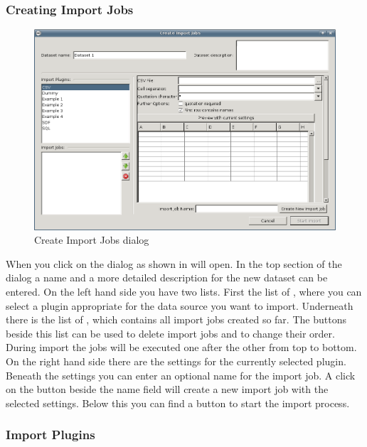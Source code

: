 \subsubsection{Creating Import Jobs}
\begin{figure}[ht]
   \centering
   \includegraphics[width=\textwidth]{images/import/import_dialog_empty.png}
   \caption{Create Import Jobs dialog}
   \label{fig:import_dialog_empty}
\end{figure}
When you click on  the  dialog
as shown in  will open. In the top section
of the dialog a name and a more detailed description for the new dataset can
be entered. On the left hand side you have two lists. First the list of , where you can select a plugin appropriate for the data source you want to import.
Underneath there is the list of , which contains all import
jobs created so far. The buttons beside this list can be used to delete import
jobs and to change their order. During import the jobs will be executed one after the other from top
to bottom. On the right hand side there are the settings for the currently selected plugin.
Beneath the settings you can enter an optional name for the import job. A click
on the button beside the name field will create a new import job with the
selected settings. Below this you can find a button to start the import process.

\subsubsection{Import Plugins}
\label{subsubsec:ImportPlugins}
